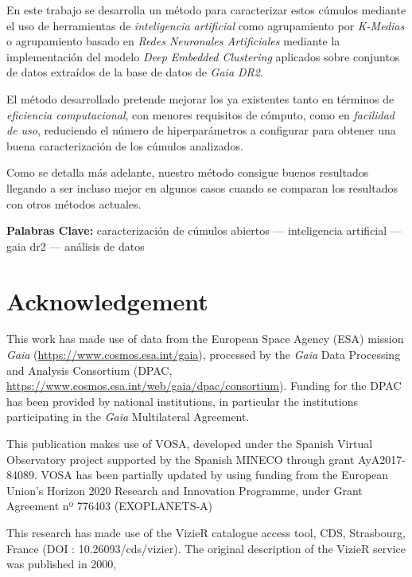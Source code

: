 \documentclass[11pt, a4paper, english]{book}
\begin{document}
En este trabajo se desarrolla un método para caracterizar estos cúmulos mediante el uso de herramientas de \emph{inteligencia artificial}
como agrupamiento por \emph{K-Medias} o agrupamiento basado en \emph{Redes Neuronales Artificiales} mediante la implementación del
modelo \emph{Deep Embedded Clustering} aplicados sobre conjuntos de datos extraídos de la base de datos de \emph{Gaia DR2}.

El método desarrollado pretende mejorar los ya existentes tanto en términos de \emph{eficiencia computacional}, con menores requisitos de cómputo,
como en \emph{facilidad de uso}, reduciendo el número de hiperparámetros a configurar para obtener una buena caracterización de los cúmulos analizados.

Como se detalla más adelante, nuestro método consigue buenos resultados llegando a ser incluso mejor en algunos casos cuando se comparan
los resultados con otros métodos actuales.

\medskip

{\bf Palabras Clave:} caracterización de cúmulos abiertos --- inteligencia artificial --- gaia dr2 --- análisis de datos

\chapter{Acknowledgement}

This work has made use of data from the European Space Agency (ESA) mission
{\it Gaia} (\url{https://www.cosmos.esa.int/gaia}), processed by the {\it Gaia}
Data Processing and Analysis Consortium (DPAC,
\url{https://www.cosmos.esa.int/web/gaia/dpac/consortium}). Funding for the DPAC
has been provided by national institutions, in particular the institutions
participating in the {\it Gaia} Multilateral Agreement.

\medskip

This publication makes use of VOSA, developed under the Spanish Virtual Observatory project
supported by the Spanish MINECO through grant AyA2017-84089.
VOSA has been partially updated by using funding from the European Union's Horizon 2020 Research
and Innovation Programme, under Grant Agreement nº 776403 (EXOPLANETS-A)

\medskip

This research has made use of the VizieR catalogue access tool, CDS, Strasbourg, France (DOI : 10.26093/cds/vizier).
The original description of the VizieR service was published in 2000, \cite[A\&AS 143, 23]{ochsenbein2000vizier}
\end{document}
